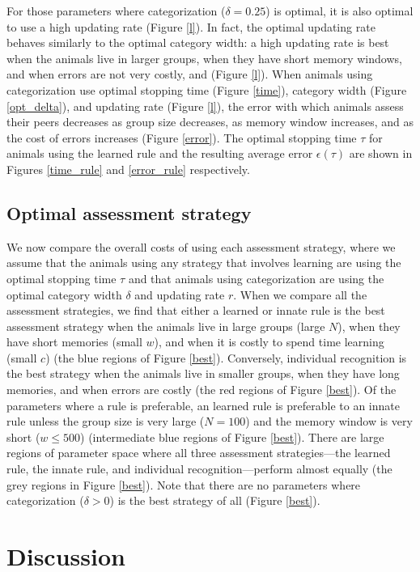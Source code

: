 For those parameters where categorization ($\delta=0.25$) is optimal, it is also optimal to use a high updating rate (Figure \ref{l}). In fact, the optimal updating rate behaves similarly to the optimal category width: a high updating rate is best when the animals live in larger groups, when they have short memory windows, and when errors are not very costly, and  (Figure \ref{l}). When animals using categorization use optimal stopping time (Figure \ref{time}), category width (Figure \ref{opt_delta}), and updating rate (Figure \ref{l}), the error with which animals assess their peers decreases as group size decreases, as memory window increases, and as the cost of errors increases (Figure \ref{error}). The optimal stopping time $\tau$ for animals using the learned rule and the resulting average error $\epsilon(\tau)$ are shown in Figures \ref{time_rule} and \ref{error_rule} respectively.


\subsection*{Optimal assessment strategy}
We now compare the overall costs of using each assessment strategy, where we assume that the animals using any strategy that involves learning are using the optimal stopping time $\tau$ and that animals using categorization are using the optimal category width $\delta$ and updating rate $r$. When we compare all the assessment strategies, we find that either a learned or innate rule is the best assessment strategy when the animals live in large groups (large $N$), when they have short memories (small $w$), and when it is costly to spend time learning (small $c$) (the blue regions of Figure \ref{best}). Conversely, individual recognition is the best strategy when the animals live in smaller groups, when they have long memories, and when errors are costly (the red regions of Figure \ref{best}). Of the parameters where a rule is preferable, an learned rule is preferable to an innate rule unless the group size is very large ($N=100$) and the memory window is very short ($w\leq500$) (intermediate blue regions of Figure \ref{best}). There are large regions of parameter space where all three assessment strategies---the learned rule, the innate rule, and individual recognition---perform almost equally (the grey regions in Figure \ref{best}). Note that there are no parameters where categorization ($\delta>0$) is the best strategy of all (Figure \ref{best}).  

\section*{Discussion}

